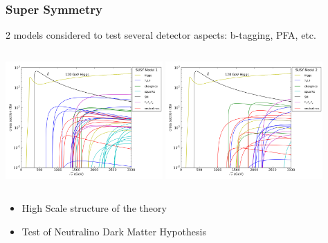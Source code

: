 \documentclass{beamer}
\begin{document}
\begin{frame}
\frametitle{Super Symmetry}
2 models considered to test several detector aspects: b-tagging, PFA, etc.
\begin{columns}[c]
\column{6cm}
\includegraphics[width=6cm]{susy_model1.png}
\column{6cm}
\includegraphics[width=6cm]{susy_model2.png}
\end{columns}
\begin{itemize}
  \item High Scale structure of the theory
  \item Test of Neutralino Dark Matter Hypothesis
\end{itemize}
\end{frame}
\end{document}
